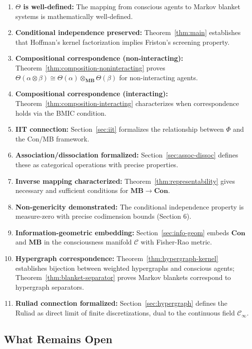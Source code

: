 \documentclass[11pt,a4paper]{article}
\theoremstyle{definition}
\theoremstyle{plain}
\theoremstyle{remark}
\newcommand{\Con}{\mathbf{Con}}
\newcommand{\MB}{\mathbf{MB}}
\begin{document}
\begin{enumerate}
    \item \textbf{$\Theta$ is well-defined:} The mapping from conscious agents to Markov blanket systems is mathematically well-defined.
    \item \textbf{Conditional independence preserved:} Theorem~\ref{thm:main} establishes that Hoffman's kernel factorization implies Friston's screening property.
    \item \textbf{Compositional correspondence (non-interacting):} Theorem~\ref{thm:composition-noninteracting} proves $\Theta(\alpha \otimes \beta) \cong \Theta(\alpha) \otimes_{\MB} \Theta(\beta)$ for non-interacting agents.
    \item \textbf{Compositional correspondence (interacting):} Theorem~\ref{thm:composition-interacting} characterizes when correspondence holds via the BMIC condition.
    \item \textbf{IIT connection:} Section~\ref{sec:iit} formalizes the relationship between $\Phi$ and the Con/MB framework.
    \item \textbf{Association/dissociation formalized:} Section~\ref{sec:assoc-dissoc} defines these as categorical operations with precise properties.
    \item \textbf{Inverse mapping characterized:} Theorem~\ref{thm:representability} gives necessary and sufficient conditions for $\MB \to \Con$.
    \item \textbf{Non-genericity demonstrated:} The conditional independence property is measure-zero with precise codimension bounds (Section 6).
    \item \textbf{Information-geometric embedding:} Section~\ref{sec:info-geom} embeds $\Con$ and $\MB$ in the consciousness manifold $\mathcal{C}$ with Fisher-Rao metric.
    \item \textbf{Hypergraph correspondence:} Theorem~\ref{thm:hypergraph-kernel} establishes bijection between weighted hypergraphs and conscious agents; Theorem~\ref{thm:blanket-separator} proves Markov blankets correspond to hypergraph separators.
    \item \textbf{Ruliad connection formalized:} Section~\ref{sec:hypergraph} defines the Ruliad as direct limit of finite discretizations, dual to the continuous field $\mathcal{C}_\infty$.
\end{enumerate}

\subsection{What Remains Open}
\end{document}
